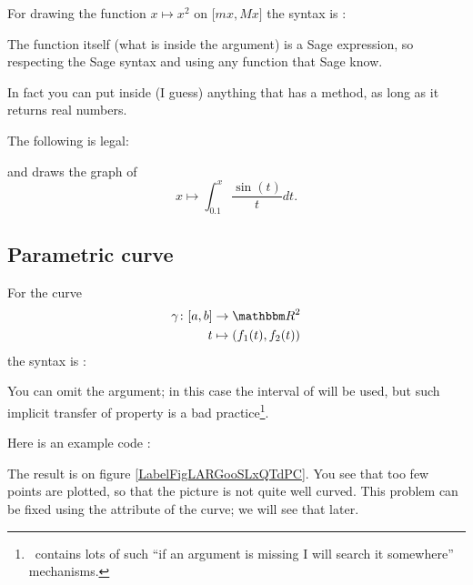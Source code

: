 For drawing the function \( x\mapsto x^2\) on \( \mathopen[ mx , Mx \mathclose]\) the syntax is :



The function itself (what is inside the  argument) is a Sage expression, so respecting the Sage syntax and using any function that Sage know.

In fact you can put inside  (I guess) anything that has a  method, as long as it returns real numbers.

The following is legal:

and draws the graph of
\begin{equation}
    x\mapsto \int_{0.1}^x\frac{ \sin(t) }{ t }dt.
\end{equation}

\subsection{Parametric curve}

For the curve
\begin{equation}
    \begin{aligned}
        \gamma\colon \mathopen[ a , b \mathclose]&\to \eR^2 \\
        t&\mapsto (  f_1(t),f_2(t)  ) 
    \end{aligned}
\end{equation}
the syntax is :


You can omit the  argument; in this case the interval of  will be used, but such implicit transfer of property is a bad practice\footnote{\yanntricks\ contains lots of such ``if an argument is missing I will search it somewhere'' mechanisms.}.

Here is an example code :


The result is on figure \ref{LabelFigLARGooSLxQTdPC}. You see that too few points are plotted, so that the picture is not quite well curved. This problem can be fixed using the  attribute of the curve; we will see that later.

\newcommand{\CaptionFigLARGooSLxQTdPC}{This is a parametric curve, a Lyssajou.}


